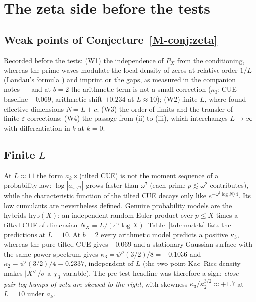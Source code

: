 \documentclass[12pt]{amsart}
\theoremstyle{remark}
\newcommand{\eps}{\varepsilon}
\newcommand{\1}{\mathbf{1}}
\begin{document}
\section{The zeta side before the tests}\label{sec:zetasupp}

\subsection*{Weak points of Conjecture~\ref{M-conj:zeta}}
Recorded before the tests: (W1) the independence of $P_X$ from the
conditioning, whereas the prime waves modulate the local density of zeros
at relative order $1/L$ (Landau's formula \cite{Landau12,Gonek93}) and
imprint on the gaps, as measured in the companion notes
\cite{companion2,companion3} --- and at $b=2$ the arithmetic term is not a
small correction ($\kappa_3$: CUE baseline $-0.069$, arithmetic shift
$+0.234$ at $L\approx10$); (W2) finite $L$, where \cite{companion1} found
effective dimensions $N=L+c$; (W3) the order of limits and the transfer of
finite-$\eps$ corrections; (W4) the passage from (ii) to (iii), which
interchanges $L\to\infty$ with differentiation in $k$ at $k=0$.

\subsection*{Finite $L$}
At $L\approx11$ the form $a_k\times$(tilted CUE) is not the moment sequence
of a probability law: $\log|a_{i\omega/2}|$ grows faster than $\omega^2$
(each prime $p\lesssim\omega^2$ contributes), while the characteristic
function of the tilted CUE decays only like
$e^{-\omega^2\log N/4}$. Its low cumulants are nevertheless defined.
Genuine probability models are the hybrids $\mathrm{hyb}(X)$: an
independent random Euler product over $p\le X$ times a tilted CUE of
dimension $N_X=L/(e^\gamma\log X)$. Table~\ref{tab:models} lists the
predictions at $L=10$. At $b=2$ every arithmetic model predicts a positive
$\kappa_3$, whereas the pure tilted CUE gives $-0.069$ and a stationary
Gaussian surface with the same power spectrum gives
$\kappa_3=\psi''(3/2)/8=-0.1036$ and $\kappa_2=\psi'(3/2)/4=0.2337$,
independent of $L$ (the two-point Kac--Rice density makes
$|X''|/\sigma$ a $\chi_3$ variable). The pre-test headline was therefore a
sign: \emph{close-pair log-humps of zeta are skewed to the right}, with
skewness $\kappa_3/\kappa_2^{3/2}\approx+1.7$ at $L=10$ under $a_k$.
\end{document}
